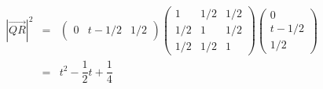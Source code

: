 \documentclass[dvipdfmx,a4]{jsarticle}
\begin{document}
\begin{eqnarray*}
  |\overrightarrow{QR}| ^2
  &=&
  \begin{pmatrix}
    0 & t-1/2 & 1/2
  \end{pmatrix}
  \begin{pmatrix}
    1   & 1/2 & 1/2 \\
    1/2 & 1   & 1/2 \\
    1/2 & 1/2 & 1
  \end{pmatrix}
  \begin{pmatrix}
    0     \\
    t-1/2 \\
    1/2
  \end{pmatrix}\\
  &=&
  t^2-\dfrac{1}{2}t+\dfrac{1}{4}
\end{eqnarray*}
\end{document}

